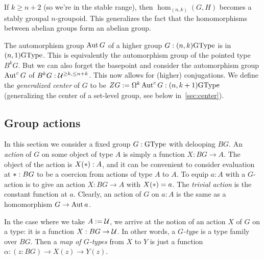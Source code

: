 If $k\ge n+2$ (so we're in the stable range), then $\hom_{(n,k)}(G,H)$
becomes a stably groupal $n$-groupoid. This generalizes the
fact that the homomorphisms between abelian groups form an abelian
group.

The automorphism group $\operatorname{Aut} G$ of a higher group $G:(n,k)\mathrm{GType}$ is in
$(n,1)\mathrm{GType}$.
This is equivalently the automorphism group of the pointed type $B^kG$.
But we can also forget the basepoint and consider the
automorphism group $\operatorname{Aut}^c G$ of $B^kG:\mathcal{U}^{\ge k,\le n+k}$. This
now allows for (higher) conjugations. We define the \emph{generalized
  center} of $G$ to be $ZG := \Omega^k\operatorname{Aut}^c G : (n,k+1)\mathrm{GType}$
(generalizing the center of a set-level group,
see below in~\cref{sec:center}).

\subsection{Group actions}
\label{sec:actions}

In this section we consider a fixed group $G : \mathrm{GType}$ with delooping
$BG$. An \emph{action} of $G$ on some object of type $A$ is simply
a function $X : BG \to A$. The object of the action is $X(\ast) : A$,
and it can be convenient to consider evaluation at $\ast : BG$ to be a
coercion from actions of type $A$ to $A$. To equip $a : A$ with a
$G$-action is to give an action $X : BG \to A$ with $X(\ast)=a$. The
\emph{trivial action} is the constant function at $a$. Clearly, an
action of $G$ on $a:A$ is the same as a homomorphism $G \to \operatorname{Aut} a$.

In the case where we take $A:=\mathcal{U}$, we arrive at the notion of an action $X$ of $G$ on a type:
it is a function $X:BG\to\mathcal{U}$. 
In other words, a \emph{$G$-type} is a type family over $BG$.
Then a \emph{map of $G$-types} from $X$ to $Y$ is just a function $\alpha :
(z : BG) \to X(z) \to Y(z)$.

